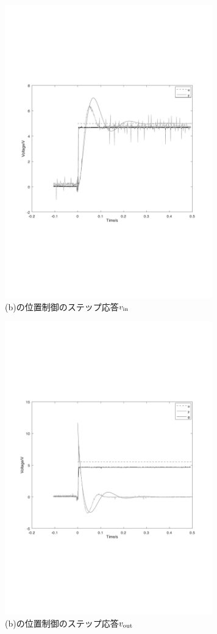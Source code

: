 \documentclass[uplatex, 11pt,a4j, titlepage]{jsarticle}
\begin{document}
\begin{figure}[h]
    \centering
    \includegraphics[width=9cm]{unitpbin.pdf}
    \caption{(b)の位置制御のステップ応答$v_{\rm in}$}
    \label{unitpbin}
\end{figure}

\begin{figure}[h]
    \centering
    \includegraphics[width=9cm]{unitpvout.pdf}
    \caption{(b)の位置制御のステップ応答$v_{\rm out}$}
    \label{unitpbout}
\end{figure}
\end{document}
